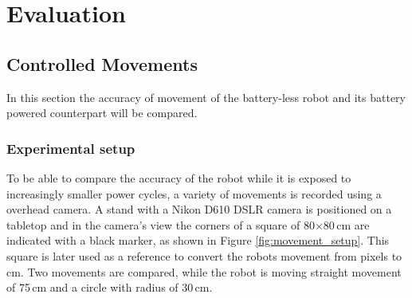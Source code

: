 \chapter{Evaluation}
\label{chp:evaluation}

\section{Controlled Movements}
\label{sec:controlled_movements}




In this section the accuracy of movement of the battery-less robot and its battery powered counterpart will be compared.

\subsection{Experimental setup}

To be able to compare the accuracy of the robot while it is exposed to increasingly smaller power cycles, a variety of movements is recorded using a overhead camera.
A stand with a Nikon D610 DSLR camera is positioned on a tabletop and in the camera's view the corners of a square of 80$\times$80\,cm are indicated with a black marker, as shown in Figure \ref{fig:movement_setup}.
This square is later used as a reference to convert the robots movement from pixels to cm.
Two movements are compared, while the robot is moving straight movement of 75\,cm and a circle with radius of 30\,cm.

